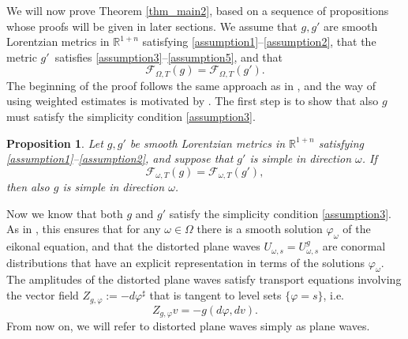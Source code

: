 \documentclass[11pt,letterpaper]{amsart}
\newtheorem{Proposition}[Theorem]{Proposition}
\theoremstyle{definition}
\numberwithin{equation}{section}
\newcommand{\mR}{\mathbb{R}}                    %
\begin{document}
We will now prove Theorem \ref{thm_main2}, based on a sequence of propositions whose proofs will be given in later sections. We assume that $g, g'$ are smooth Lorentzian metrics in $\mR^{1+n}$ satisfying \eqref{assumption1}--\eqref{assumption2}, that the metric $g'$ satisfies \eqref{assumption3}--\eqref{assumption5}, and that 
\[
\mathcal{F}_{\Omega,T}(g) = \mathcal{F}_{\Omega,T}(g').
\]
The beginning of the proof follows the same approach as in \cite{oksanen2024}, and the way of using weighted estimates is motivated by \cite{krishnan2023}. The first step is to show that also $g$ must satisfy the simplicity condition \eqref{assumption3}.

\begin{Proposition} \label{prop_simplicity_detection}
Let $g, g'$ be smooth Lorentzian metrics  in $\mR^{1+n}$ satisfying \eqref{assumption1}--\eqref{assumption2}, and suppose that $g'$ is simple in direction $\omega$. If 
\[
\mathcal{F}_{\omega,T}(g) = \mathcal{F}_{\omega,T}(g'),
\]
then also $g$ is simple in direction $\omega$.
\end{Proposition}

Now we know that both $g$ and $g'$ satisfy the simplicity condition \eqref{assumption3}. As in \cite{oksanen2024}, this ensures that for any $\omega \in \Omega$ there is a smooth solution $\varphi_{\omega}$ of the eikonal equation, and that the distorted plane waves $U_{\omega,s} = U^g_{\omega,s}$ are conormal distributions that have an explicit representation in terms of the solutions $\varphi_{\omega}$. The amplitudes of the distorted plane waves satisfy transport equations involving the vector field $Z_{g,\varphi} := -d\varphi^{\sharp}$ that is tangent to level sets $\{ \varphi = s \}$, i.e.\ 
\[
Z_{g,\varphi} v = -g(d\varphi, dv).
\]
From now on, we will refer to distorted plane waves simply as plane waves.
\end{document}
